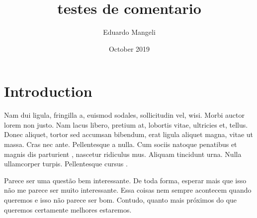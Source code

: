 \documentclass{article}
\title{testes de comentario}
\author{Eduardo Mangeli}
\date{October 2019}
\begin{document}
\listofcomentario

\maketitle

\section{Introduction}

%
%
%
%



Nam dui ligula, fringilla a, euismod sodales, sollicitudin vel, wisi.  Morbi
auctor lorem non justo. Nam lacus libero, pretium at, lobortis vitae, ultricies et,
tellus. Donec aliquet, tortor sed accumsan bibendum, erat ligula aliquet magna,
vitae  
ut massa. Cras nec ante. Pellentesque a nulla. Cum sociis natoque penatibus et
magnis dis parturient , nascetur ridiculus mus. Aliquam tincidunt urna.
Nulla ullamcorper  turpis. Pellentesque cursus .




Parece ser uma questão bem interessante. De toda forma, esperar mais que isso não me parece ser muito interessante. Essa coisas nem sempre acontecem quando queremos e isso não parece ser bom. Contudo, quanto mais próximos do que queremos certamente melhores estaremos.



\end{document}
